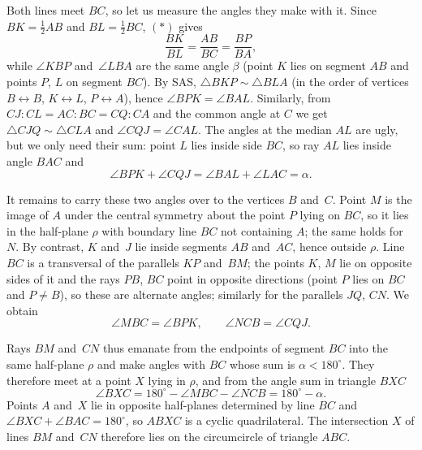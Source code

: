 {    Both lines meet $BC$, so let us measure the angles they make with it. Since $BK = \tfrac12 AB$ and $BL = \tfrac12 BC$, $(*)$ gives
    $$
    \frac{BK}{BL} = \frac{AB}{BC} = \frac{BP}{BA},
    $$
    while $\angle KBP$ and~$\angle LBA$ are the same angle $\beta$ (point $K$ lies on segment $AB$ and points $P$, $L$ on segment $BC$). By SAS, $\triangle BKP \sim \triangle BLA$ (in the order of vertices $B \leftrightarrow B$, $K \leftrightarrow L$, $P \leftrightarrow A$), hence $\angle BPK = \angle BAL$. Similarly, from $CJ : CL = AC : BC = CQ : CA$ and the common angle at $C$ we get $\triangle CJQ \sim \triangle CLA$ and $\angle CQJ = \angle CAL$. The angles at the median $AL$ are ugly, but we only need their sum: point $L$ lies inside side $BC$, so ray $AL$ lies inside angle $BAC$ and
    $$
    \angle BPK + \angle CQJ = \angle BAL + \angle LAC = \alpha.
    $$

    It remains to carry these two angles over to the vertices $B$ and~$C$. Point $M$ is the image of $A$ under the central symmetry about the point $P$ lying on $BC$, so it lies in the half-plane $\rho$ with boundary line $BC$ not containing $A$; the same holds for $N$. By contrast, $K$ and~$J$ lie inside segments $AB$ and~$AC$, hence outside $\rho$. Line $BC$ is a transversal of the parallels $KP$ and~$BM$; the points $K$, $M$ lie on opposite sides of it and the rays $PB$, $BC$ point in opposite directions (point $P$ lies on $BC$ and $P \neq B$), so these are alternate angles; similarly for the parallels $JQ$, $CN$. We obtain
    $$
    \angle MBC = \angle BPK, \qquad \angle NCB = \angle CQJ.
    $$

    Rays $BM$ and~$CN$ thus emanate from the endpoints of segment $BC$ into the same half-plane $\rho$ and make angles with $BC$ whose sum is $\alpha < 180^\circ$. They therefore meet at a point $X$ lying in $\rho$, and from the angle sum in triangle $BXC$
    $$
    \angle BXC = 180^\circ - \angle MBC - \angle NCB = 180^\circ - \alpha.
    $$
    Points $A$ and~$X$ lie in opposite half-planes determined by line $BC$ and $\angle BXC + \angle BAC = 180^\circ$, so $ABXC$ is a cyclic quadrilateral. The intersection $X$ of lines $BM$ and~$CN$ therefore lies on the circumcircle of triangle $ABC$.
}

